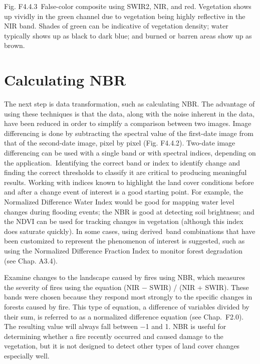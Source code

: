 \documentclass[
  letterpaper,
  DIV=11,
  numbers=noendperiod]{scrreprt}
\begin{document}
Fig. F4.4.3~False-color composite using SWIR2, NIR, and red. Vegetation
shows up vividly in the green channel due to vegetation being highly
reflective in the NIR band. Shades of green can be indicative of
vegetation density; water typically shows up as black to dark blue; and
burned or barren areas show up as brown.

\hypertarget{calculating-nbr}{%
\section{Calculating NBR}\label{calculating-nbr}}

The next step is data transformation, such as calculating NBR. The
advantage of using these techniques is that the data, along with the
noise inherent in the data, have been reduced in order to simplify a
comparison between two images. Image differencing is done by subtracting
the spectral value of the first-date image from that of the second-date
image, pixel by pixel (Fig. F4.4.2). Two-date image differencing can be
used with a single band or with spectral indices, depending on the
application.~Identifying the correct band or index to identify change
and finding the correct thresholds to classify it are critical to
producing meaningful results. Working with indices known to highlight
the land cover conditions before and after a change event of interest is
a good starting point. For example, the Normalized Difference Water
Index would be good for mapping water level changes during flooding
events; the NBR is good at detecting soil brightness; and the NDVI can
be used for tracking changes in vegetation (although this index does
saturate quickly). In some cases, using derived~band combinations that
have been customized to represent the phenomenon of interest is
suggested, such as using the Normalized Difference Fraction Index to
monitor forest degradation (see Chap. A3.4).

Examine changes to the landscape caused by fires using NBR, which
measures the severity of fires using the equation (NIR − SWIR) / (NIR +
SWIR). These bands were chosen because they respond most strongly to the
specific changes in forests caused by fire. This type of equation, a
difference of variables divided by their sum, is referred to as a
normalized difference equation (see Chap.~F2.0). The resulting value
will always fall between −1 and 1. NBR is useful for determining whether
a fire recently occurred and caused damage to the vegetation, but it is
not designed to detect other types of land cover changes especially
well.
\end{document}
